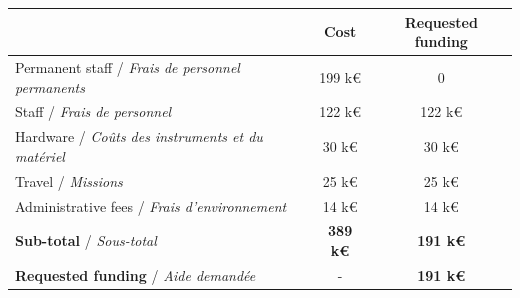 \documentclass[a4paper,11pt,defblank]{article}
\newcommand{\todo}[1]{\mynote{TODO}{#1}}
\begin{document}
\begin{center}
  \begin{tabular} {|l|c|c|}\hline
    & Cost & Requested funding\\\hline
    Permanent staff / \emph{Frais de personnel permanents}                      & 199 k\euro & 0\\\hline
    Staff / \emph{Frais de personnel}                      & 122 k\euro & 122 k\euro\\\hline %
Hardware / \emph{Coûts des instruments et du matériel} & 30 k\euro &30 k\euro\\\hline %
Travel / \emph{Missions}                               & 25 k\euro&25 k\euro\\\hline
Administrative fees / \emph{Frais d’environnement}     & 14 k\euro&14 k\euro \\\hline
\textbf{Sub-total} / \emph{Sous-total}                 & \textbf{389 k\euro}& \textbf{191 k\euro}\\\hline
\textbf{Requested funding} / \emph{Aide demandée}      & - &\textbf{191 k\euro}\\\hline
\end{tabular}
\end{center}


\end{document}
